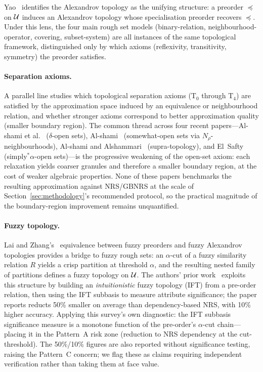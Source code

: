 Yao~\cite{Yao2023Alexandrov} identifies the Alexandrov topology as the
unifying structure: a preorder $\preceq$ on $\mathcal{U}$ induces an Alexandrov
topology whose specialisation preorder recovers $\preceq$.  Under this lens,
the four main rough set models (binary-relation, neighbourhood-operator,
covering, subset-system) are all instances of the same topological framework,
distinguished only by which axioms (reflexivity, transitivity, symmetry) the
preorder satisfies.

\paragraph{Separation axioms.}
A parallel line studies which topological separation axioms (T$_0$ through
T$_4$) are satisfied by the approximation space induced by an equivalence or
neighbourhood relation, and whether stronger axioms correspond to better
approximation quality (smaller boundary region).  The common thread across
four recent papers---Al-shami et al.~\cite{AlShami2025delta} ($\delta$-open
sets), Al-shami~\cite{AlShami2022topology} (somewhat-open sets via
$N_\rho$-neighbourhoods), Al-shami and Alshammari~\cite{AlShami2022supra}
(supra-topology), and El~Safty~\cite{ElSafty2021}
(simply$^*\alpha$-open sets)---is the progressive weakening of the open-set
axiom: each relaxation yields coarser granules and therefore a smaller
boundary region, at the cost of weaker algebraic properties.  None of
these papers benchmarks the resulting approximation against NRS/GBNRS at
the scale of Section~\ref{sec:methodology}'s recommended protocol, so
the practical magnitude of the boundary-region improvement remains
unquantified.

\paragraph{Fuzzy topology.}
Lai and Zhang's~\cite{LaiZhang2006} equivalence between fuzzy preorders and
fuzzy Alexandrov topologies provides a bridge to fuzzy rough sets: an $\alpha$-cut
of a fuzzy similarity relation $R$ yields a crisp partition at threshold
$\alpha$, and the resulting nested family of partitions defines a fuzzy
topology on $\mathcal{U}$.  The authors' prior work~\cite{DaiTT2024IFT} exploits
this structure by building an \emph{intuitionistic} fuzzy topology (IFT)
from a pre-order relation, then using the IFT subbasis to measure attribute
significance; the paper reports reducts 50\% smaller on average than
dependency-based NRS, with 10\% higher accuracy.
Applying this survey's own diagnostic: the IFT subbasis significance measure
is a monotone function of the pre-order's $\alpha$-cut chain---placing it in
the Pattern~A risk zone (reduction to NRS dependency at the cut-threshold).
The 50\%/10\% figures are also reported without significance testing, raising
the Pattern~C concern; we flag these as claims requiring independent
verification rather than taking them at face value.

